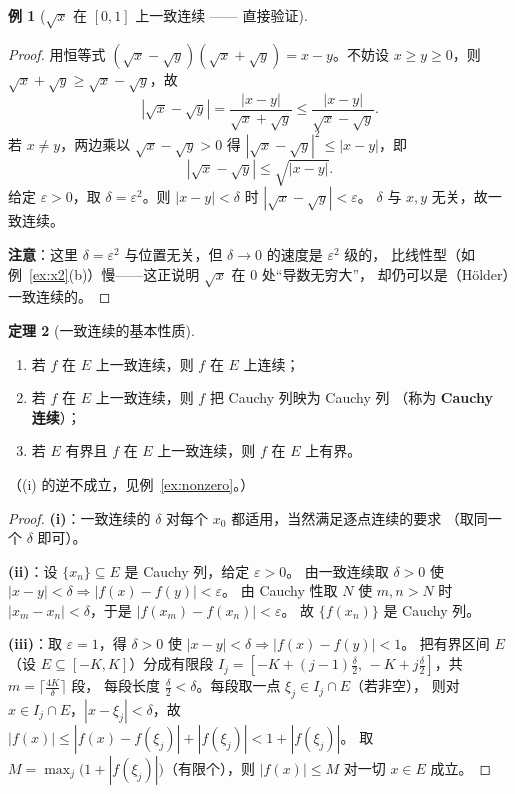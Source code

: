 \documentclass[11pt,a4paper]{ctexart}
\theoremstyle{definition}
\newtheorem{theorem}{定理}[section]
\newtheorem{example}[theorem]{例}
\theoremstyle{remark}
\newcommand{\eps}{\varepsilon}
\newcommand{\abs}[1]{\left\lvert #1 \right\rvert}
\begin{document}
\begin{example}[{$\sqrt x$ 在 $[0,1]$ 上一致连续 —— 直接验证}]\label{ex:sqrt-unif}
\end{example}

\begin{proof}
用恒等式 $(\sqrt x-\sqrt y)(\sqrt x+\sqrt y)=x-y$。不妨设 $x\ge y\ge0$，则 $\sqrt x+\sqrt y\ge\sqrt x-\sqrt y$，故
\[
  \abs{\sqrt x-\sqrt y}=\frac{\abs{x-y}}{\sqrt x+\sqrt y}
  \le\frac{\abs{x-y}}{\sqrt x-\sqrt y}.
\]
若 $x\neq y$，两边乘以 $\sqrt x-\sqrt y>0$ 得 $\abs{\sqrt x-\sqrt y}^{2}\le\abs{x-y}$，即
\[
  \abs{\sqrt x-\sqrt y}\le\sqrt{\abs{x-y}} .
\]
给定 $\eps>0$，取 $\delta=\eps^{2}$。则 $\abs{x-y}<\delta$ 时 $\abs{\sqrt x-\sqrt y}<\eps$。
$\delta$ 与 $x,y$ 无关，故一致连续。

\textbf{注意}：这里 $\delta=\eps^{2}$ 与位置无关，但 $\delta\to0$ 的速度是 $\eps^{2}$ 级的，
比线性型（如例~\ref{ex:x2}(b)）慢——这正说明 $\sqrt x$ 在 $0$ 处“导数无穷大”，
却仍可以是（Hölder）一致连续的。

\end{proof}

\begin{theorem}[一致连续的基本性质]\label{thm:unif-prop}
\begin{enumerate}[label=(\roman*)]
  \item 若 $f$ 在 $E$ 上一致连续，则 $f$ 在 $E$ 上连续；
  \item 若 $f$ 在 $E$ 上一致连续，则 $f$ 把 Cauchy 列映为 Cauchy 列
        （称为 \textbf{Cauchy 连续}）；
  \item 若 $E$ 有界且 $f$ 在 $E$ 上一致连续，则 $f$ 在 $E$ 上有界。
\end{enumerate}
（(i) 的逆不成立，见例~\ref{ex:nonzero}。）
\end{theorem}

\begin{proof}
\textbf{(i)}：一致连续的 $\delta$ 对每个 $x_0$ 都适用，当然满足逐点连续的要求
（取同一个 $\delta$ 即可）。

\textbf{(ii)}：设 $\{x_n\}\subseteq E$ 是 Cauchy 列，给定 $\eps>0$。
由一致连续取 $\delta>0$ 使 $\abs{x-y}<\delta\Rightarrow\abs{f(x)-f(y)}<\eps$。
由 Cauchy 性取 $N$ 使 $m,n>N$ 时 $\abs{x_m-x_n}<\delta$，于是 $\abs{f(x_m)-f(x_n)}<\eps$。
故 $\{f(x_n)\}$ 是 Cauchy 列。

\textbf{(iii)}：取 $\eps=1$，得 $\delta>0$ 使 $\abs{x-y}<\delta\Rightarrow\abs{f(x)-f(y)}<1$。
把有界区间 $E$（设 $E\subseteq[-K,K]$）分成有限段
$I_j=[-K+(j-1)\frac\delta2,\,-K+j\frac\delta2]$，共 $m=\lceil\frac{4K}{\delta}\rceil$ 段，
每段长度 $\frac\delta2<\delta$。每段取一点 $\xi_j\in I_j\cap E$（若非空），
则对 $x\in I_j\cap E$，$\abs{x-\xi_j}<\delta$，故
$\abs{f(x)}\le\abs{f(x)-f(\xi_j)}+\abs{f(\xi_j)}<1+\abs{f(\xi_j)}$。
取 $M=\max_j\bigl(1+\abs{f(\xi_j)}\bigr)$（有限个），则 $\abs{f(x)}\le M$ 对一切 $x\in E$ 成立。

\end{proof}
\end{document}
